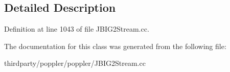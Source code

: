 \subsection{Detailed Description}


Definition at line 1043 of file J\+B\+I\+G2\+Stream.\+cc.



The documentation for this class was generated from the following file\+:\begin{DoxyCompactItemize}
\item 
thirdparty/poppler/poppler/J\+B\+I\+G2\+Stream.\+cc\end{DoxyCompactItemize}
